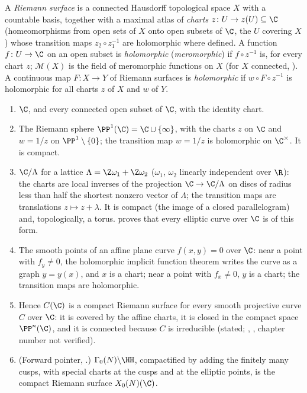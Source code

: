 \begin{definition}\label{def:curves:riemann-surface}
A \emph{Riemann surface} is a connected Hausdorff topological space $X$ with a countable basis, together with a maximal atlas of \emph{charts}
$z\colon U\to z(U)\subseteq\C$ (homeomorphisms from open sets of $X$ onto open subsets of $\C$, the $U$ covering $X$) whose transition maps $z_2\circ z_1^{-1}$ are holomorphic
where defined. A function $f\colon U\to\C$ on an open subset is \emph{holomorphic} (\emph{meromorphic}) if $f\circ z^{-1}$ is, for every chart $z$; $\mathcal M(X)$ is the field of
meromorphic functions on $X$ (for $X$ connected, ). A continuous map $F\colon X\to Y$ of Riemann surfaces is \emph{holomorphic} if $w\circ F\circ z^{-1}$ is
holomorphic for all charts $z$ of $X$ and $w$ of $Y$.
\end{definition}

\begin{example}\label{ex:curves:riemann-surfaces}
\leavevmode
\begin{enumerate}[label=(\alph*)]
\item $\C$, and every connected open subset of $\C$, with the identity chart.
\item The Riemann sphere $\PP^1(\C)=\C\cup\{\infty\}$, with the charts $z$ on $\C$ and $w=1/z$ on $\PP^1\setminus\{0\}$; the transition map $w=1/z$ is holomorphic on
$\C^\times$. It is compact.
\item $\C/\Lambda$ for a lattice $\Lambda=\Z\omega_1+\Z\omega_2$ ($\omega_1$, $\omega_2$ linearly independent over $\R$): the charts are local inverses of the projection
$\C\to\C/\Lambda$ on discs of radius less than half the shortest nonzero vector of $\Lambda$; the transition maps are translations $z\mapsto z+\lambda$. It is compact
(the image of a closed parallelogram) and, topologically, a torus.  proves that every elliptic curve over $\C$ is of this form.
\item The smooth points of an affine plane curve $f(x,y)=0$ over $\C$: near a point with $f_y\ne0$, the holomorphic implicit function theorem writes the curve
as a graph $y=y(x)$, and $x$ is a chart; near a point with $f_x\ne0$, $y$ is a chart; the transition maps are holomorphic.
\item Hence $C(\C)$ is a compact Riemann surface for every smooth projective curve $C$ over $\C$: it is covered by the affine charts, it is closed in the compact
space $\PP^n(\C)$, and it is connected because $C$ is irreducible (stated; \cite[Appendix B]{Hartshorne}, \cite[Chapter VII]{Miranda}, chapter number not verified).
\item (Forward pointer, .) $\Gamma_0(N)\backslash\HH$, compactified by adding the finitely many cusps, with special charts at the cusps and at the
elliptic points, is the compact Riemann surface $X_0(N)(\C)$.
\end{enumerate}
\end{example}


